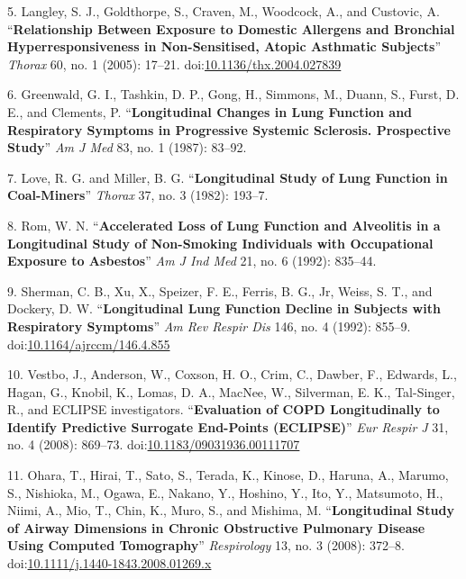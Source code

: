 \documentclass[11pt,]{article}
\begin{document}
\hypertarget{ref-Langley:2005aa}{}
5. Langley, S. J., Goldthorpe, S., Craven, M., Woodcock, A., and
Custovic, A. ``\textbf{Relationship Between Exposure to Domestic
Allergens and Bronchial Hyperresponsiveness in Non-Sensitised, Atopic
Asthmatic Subjects}'' \emph{Thorax} 60, no. 1 (2005): 17--21.
doi:\href{https://doi.org/10.1136/thx.2004.027839}{10.1136/thx.2004.027839}

\hypertarget{ref-Greenwald:1987aa}{}
6. Greenwald, G. I., Tashkin, D. P., Gong, H., Simmons, M., Duann, S.,
Furst, D. E., and Clements, P. ``\textbf{Longitudinal Changes in Lung
Function and Respiratory Symptoms in Progressive Systemic Sclerosis.
Prospective Study}'' \emph{Am J Med} 83, no. 1 (1987): 83--92.

\hypertarget{ref-Love:1982aa}{}
7. Love, R. G. and Miller, B. G. ``\textbf{Longitudinal Study of Lung
Function in Coal-Miners}'' \emph{Thorax} 37, no. 3 (1982): 193--7.

\hypertarget{ref-Rom:1992aa}{}
8. Rom, W. N. ``\textbf{Accelerated Loss of Lung Function and Alveolitis
in a Longitudinal Study of Non-Smoking Individuals with Occupational
Exposure to Asbestos}'' \emph{Am J Ind Med} 21, no. 6 (1992): 835--44.

\hypertarget{ref-Sherman:1992aa}{}
9. Sherman, C. B., Xu, X., Speizer, F. E., Ferris, B. G., Jr, Weiss, S.
T., and Dockery, D. W. ``\textbf{Longitudinal Lung Function Decline in
Subjects with Respiratory Symptoms}'' \emph{Am Rev Respir Dis} 146, no.
4 (1992): 855--9.
doi:\href{https://doi.org/10.1164/ajrccm/146.4.855}{10.1164/ajrccm/146.4.855}

\hypertarget{ref-Vestbo:2008aa}{}
10. Vestbo, J., Anderson, W., Coxson, H. O., Crim, C., Dawber, F.,
Edwards, L., Hagan, G., Knobil, K., Lomas, D. A., MacNee, W., Silverman,
E. K., Tal-Singer, R., and ECLIPSE investigators. ``\textbf{Evaluation
of COPD Longitudinally to Identify Predictive Surrogate End-Points
(ECLIPSE)}'' \emph{Eur Respir J} 31, no. 4 (2008): 869--73.
doi:\href{https://doi.org/10.1183/09031936.00111707}{10.1183/09031936.00111707}

\hypertarget{ref-Ohara:2008aa}{}
11. Ohara, T., Hirai, T., Sato, S., Terada, K., Kinose, D., Haruna, A.,
Marumo, S., Nishioka, M., Ogawa, E., Nakano, Y., Hoshino, Y., Ito, Y.,
Matsumoto, H., Niimi, A., Mio, T., Chin, K., Muro, S., and Mishima, M.
``\textbf{Longitudinal Study of Airway Dimensions in Chronic Obstructive
Pulmonary Disease Using Computed Tomography}'' \emph{Respirology} 13,
no. 3 (2008): 372--8.
doi:\href{https://doi.org/10.1111/j.1440-1843.2008.01269.x}{10.1111/j.1440-1843.2008.01269.x}
\end{document}
